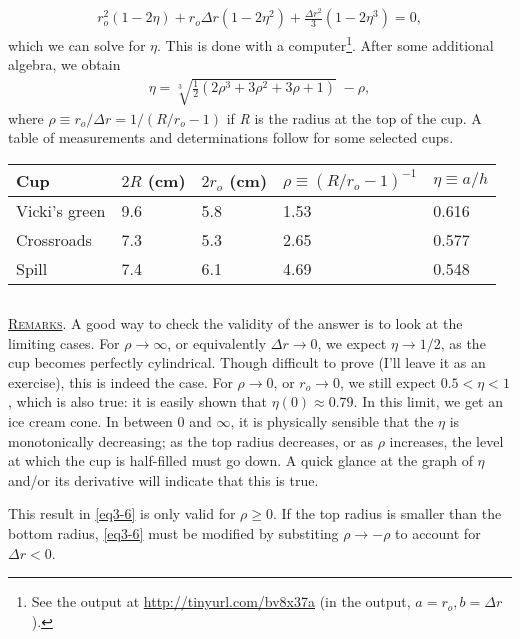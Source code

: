 \documentclass[11pt]{article}
\begin{document}
\begin{align} \label{eq3-5}
r_o^2 (1 - 2\eta) + r_o \Delta r (1 - 2\eta^2 ) + \frac{\Delta r^2}{3} (1 - 2\eta^3) = 0,
\end{align}
which we can solve for $\eta$. This is done with a computer\footnote{See the output at \url{http://tinyurl.com/bv8x37a} (in the output, $a = r_o, b=\Delta r$).}. After some additional algebra, we obtain
\begin{align} \label{eq3-6}
\boxed{\eta = \sqrt[3]{\frac{1}{2}(2\rho^3 + 3\rho^2 + 3\rho + 1)}\; - \rho},
\end{align}
where $\rho \equiv r_o / \Delta r = 1/(R/r_o - 1)$ if \textit{R} is the radius at the top of the cup. A table of measurements and determinations follow for some selected cups.
\begin{center}
\begin{tabular}{l|l|l|l|l}
Cup & $2R$ (cm) & $2r_o$ (cm) & $\rho \equiv (R/r_o - 1)^{-1}$ & $\eta \equiv a/h$ \\ \hline
Vicki's green & 9.6 & 5.8 & 1.53 & 0.616 \\
Crossroads & 7.3 & 5.3 & 2.65 & 0.577 \\
Spill & 7.4 & 6.1 & 4.69 & 0.548 \\ \hline
\end{tabular}
\end{center}
\subsection[Remarks]{} \textsc{\underline{Remarks}}. A good way to check the validity of the answer is to look at the limiting cases. For $\rho \rightarrow \infty$, or equivalently $\Delta r \rightarrow 0$, we expect $\eta \rightarrow 1/2$, as the cup becomes perfectly cylindrical. Though difficult to prove (I'll leave it as an exercise), this is indeed the case. For $\rho \rightarrow 0$, or $r_o \rightarrow 0$, we still expect $0.5 < \eta < 1$, which is also true: it is easily shown that $\eta(0) \approx 0.79$. In this limit, we get an ice cream cone. In between 0 and $\infty$, it is physically sensible that the $\eta$ is monotonically decreasing; as the top radius decreases, or as $\rho$ increases, the level at which the cup is half-filled must go down. A quick glance at the graph of $\eta$ and/or its derivative will indicate that this is true.

\vspace{10pt} This result in \eqref{eq3-6} is only valid for $\rho \geq 0$. If the top radius is smaller than the bottom radius, \eqref{eq3-6} must be modified by substiting $\rho \rightarrow -\rho$ to account for  $\Delta r < 0$. 
\end{document}
